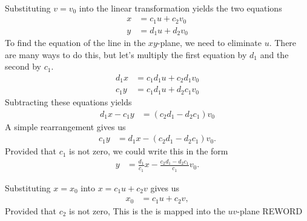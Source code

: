 \BEN
\item %
 \\
\BEN
\item Substituting $v = v_0$ into the linear transformation yields the two equations
\begin{align*}
  x &= c_1u + c_2v_0 \\ 
  y &= d_1u + d_2v_0
\end{align*}
To find the equation of the line in the $xy$-plane, we need to eliminate $u$. There are many ways to do this, but let's multiply the first equation by $d_1$ and the second by $c_1$.
\begin{align*}
  d_1x &= c_1d_1u + c_2d_1v_0 \\ 
  c_1y &= c_1d_1u + d_2c_1v_0
\end{align*}
Subtracting these equations yields
\begin{align*}
  d_1x -  c_1y &=  (c_2d_1 -  d_2c_1)v_0 
\end{align*}
A simple rearrangement gives us
\begin{align*}
  c_1y &= d_1x - (c_2d_1 -  d_2c_1)v_0 .
\end{align*}
Provided that $c_1$ is not zero, we could write this in the form
\begin{align*}
  y &= \frac{d_1}{c_1}x - \frac{c_2d_1 -  d_2c_1}{c_1}v_0 .
\end{align*}
\item Substituting $x=x_0$ into $x =c_1u + c_2v$ gives us 
\begin{align*}
  x_0 &= c_1u + c_2v,
\end{align*}
Provided that $c_2$ is not zero, 
This is the is mapped into the $uv$-plane REWORD
\EEN

